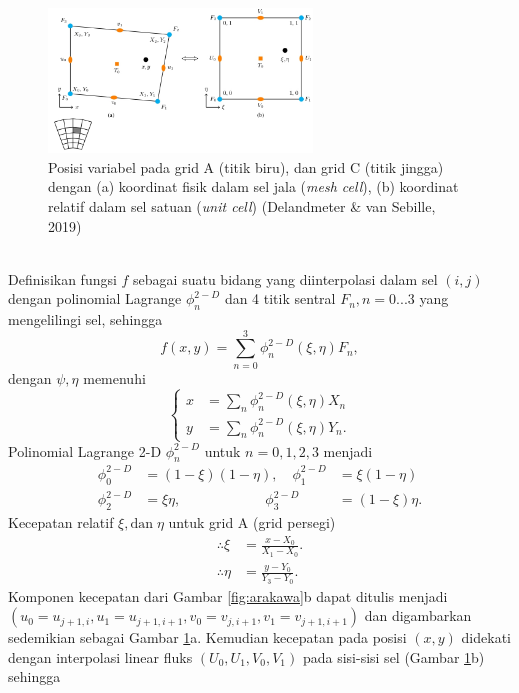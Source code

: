 \documentclass{beamer}
\begin{document}
\begin{frame}[allowframebreaks]
	\begin{figure}[H]
		\centering
		\includegraphics[width=7cm]{mesh_arakawa.jpg}
		\caption{Posisi variabel pada grid A (titik biru), dan grid C (titik jingga) dengan (a) koordinat fisik dalam sel jala (\textit{mesh cell}), (b) koordinat relatif dalam sel satuan (\textit{unit cell}) (Delandmeter \& van Sebille, 2019)}
		\label{fig:mesh}
	\end{figure}
	$\;$ \\
	Definisikan fungsi $f$ sebagai suatu bidang yang diinterpolasi dalam sel $(i,j)$ dengan polinomial Lagrange $\phi_n^{2-D}$ dan 4 titik sentral $F_n, n=0...3$ yang mengelilingi sel, sehingga
	\begin{equation}
		f(x,y)=\sum_{n=0}^{3}\phi_n^{2-D}(\xi,\eta)F_n, 
	\end{equation}
	dengan $\psi, \eta$ memenuhi  
	\begin{equation}\label{eq:xy_2d}
		\begin{cases}
			x &= \sum_n \phi_n^{2-D}(\xi,\eta)X_n \\
			y &= \sum_n \phi_n^{2-D}(\xi,\eta)Y_n.
		\end{cases}	
	\end{equation}
	Polinomial Lagrange 2-D $\phi_n^{2-D}$ untuk $n=0,1,2,3$ menjadi
	\begin{equation*}
		\begin{aligned}
			\phi_0^{2-D} &= (1-\xi)(1-\eta), \quad 	\phi_1^{2-D} &= \xi(1-\eta) \\
			\phi_2^{2-D} &= \xi\eta, \quad 	\quad \quad \quad \quad \quad \phi_3^{2-D} &= (1-\xi)\eta.
		\end{aligned}
	\end{equation*}
	Kecepatan relatif $\xi,\text{dan}\;\eta$ untuk grid A (grid persegi)
		\begin{equation*}
		\begin{aligned}
			\therefore \xi &= \frac{x-X_0}{X_1-X_0}. \\
			\therefore \eta &= \frac{y-Y_0}{Y_3-Y_0}. 
		\end{aligned}
	\end{equation*}
	Komponen kecepatan dari Gambar \ref{fig:arakawa}b dapat ditulis menjadi $(u_0=u_{j+1,i}, u_1=u_{j+1,i+1}, v_0=v_{j,i+1}, v_1=v_{j+1,i+1})$ dan digambarkan sedemikian sebagai Gambar \ref{fig:mesh}a. Kemudian kecepatan pada posisi $(x,y)$ didekati dengan interpolasi linear fluks $(U_0,U_1,V_0,V_1)$ pada sisi-sisi sel (Gambar \ref{fig:mesh}b) sehingga

\end{frame}
\end{document}
